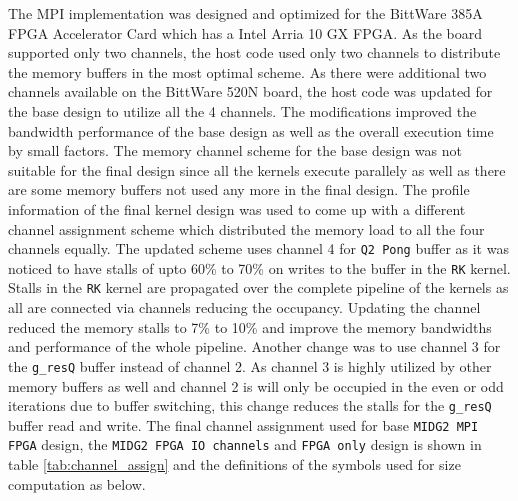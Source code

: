The MPI implementation was designed and optimized for the BittWare 385A FPGA Accelerator Card which has a
Intel Arria 10 GX FPGA. As the board supported only two channels, the host code used only two channels
to distribute the memory buffers in the most optimal scheme. As there were additional two channels
available on the BittWare 520N board, the host code was updated for the base design to utilize
all the 4 channels. The modifications improved the bandwidth performance of the base design
as well as the overall execution time by small factors. The memory channel scheme
for the base design was not suitable for the final design since all the kernels execute
parallely as well as there are some memory buffers not used any more in the final design.
The profile information of the final kernel design was used to come up with a
different channel assignment scheme which distributed the memory load to all the
four channels equally. The updated scheme uses channel 4 for \texttt{Q2 Pong} buffer
as it was noticed to have stalls of upto 60\% to 70\% on writes to the buffer in the \texttt{RK}
kernel. Stalls in the \texttt{RK} kernel are propagated over the complete pipeline of the kernels
as all are connected via channels reducing the occupancy. Updating the channel reduced
the memory stalls to 7\% to 10\% and improve the memory bandwidths and performance
of the whole pipeline. Another change was to use channel 3 for the \texttt{g\_resQ}
buffer instead of channel 2. As channel 3 is highly utilized by other memory buffers as well
and channel 2 is will only be occupied in the even or odd iterations due to buffer switching,
this change reduces the stalls for the \texttt{g\_resQ} buffer read and write.
The final channel assignment used for base \texttt{MIDG2 MPI FPGA} design, the \texttt{MIDG2 FPGA IO channels} and
\texttt{FPGA only} design is shown in table \ref{tab:channel_assign} and the definitions of the symbols used for size computation as below.
